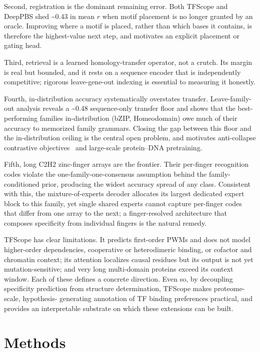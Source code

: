\documentclass[11pt,letterpaper]{article}
\newcommand{\ts}{\textasciitilde}
\begin{document}
Second, registration is the dominant remaining error. Both TFScope and DeepPBS shed
\ts0.43 in mean $r$ when motif placement is no longer granted by an oracle. Improving
where a motif is placed, rather than which bases it contains, is therefore the
highest-value next step, and motivates an explicit placement or gating head.

Third, retrieval is a learned homology-transfer operator, not a crutch. Its margin is
real but bounded, and it rests on a sequence encoder that is independently
competitive; rigorous leave-gene-out indexing is essential to measuring it honestly.

Fourth, in-distribution accuracy systematically overstates transfer. Leave-family-out
analysis reveals a \ts0.48 sequence-only transfer floor and shows that the
best-performing families in-distribution (bZIP, Homeodomain) owe much of their
accuracy to memorized family grammars. Closing the gap between this floor and the
in-distribution ceiling is the central open problem, and motivates anti-collapse
contrastive objectives~\cite{Bhatt2024} and large-scale protein--DNA pretraining.

Fifth, long C2H2 zinc-finger arrays are the frontier. Their per-finger recognition
codes violate the one-family-one-consensus assumption behind the family-conditioned
prior, producing the widest accuracy spread of any class. Consistent with this, the
mixture-of-experts decoder allocates its largest dedicated expert block to this
family, yet single shared experts cannot capture per-finger codes that differ from
one array to the next; a finger-resolved architecture that composes specificity from
individual fingers is the natural remedy.

TFScope has clear limitations. It predicts first-order PWMs and does not model
higher-order dependencies, cooperative or heterodimeric binding, or cofactor and
chromatin context; its attention localizes causal residues but its output is not yet
mutation-sensitive; and very long multi-domain proteins exceed its context window.
Each of these defines a concrete direction. Even so, by decoupling specificity
prediction from structure determination, TFScope makes proteome-scale, hypothesis-
generating annotation of TF binding preferences practical, and provides an
interpretable substrate on which these extensions can be built.

\section*{Methods}
\end{document}

